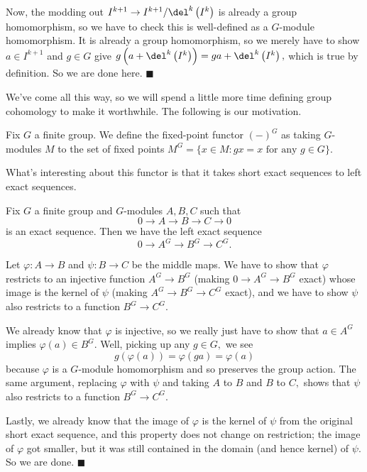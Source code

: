 Now, the modding out $I^{k+1}\to I^{k+1}/\del^k\left(I^k\right)$ is already a group homomorphism, so we have to check this is well-defined as a $G$-module homomorphism. It is already a group homomorphism, so we merely have to show $a\in I^{k+1}$ and $g\in G$ give $g\left(a+\del^k\left(I^k\right)\right)=ga+\del^k\left(I^k\right),$ which is true by definition. So we are done here. $\blacksquare$

We've come all this way, so we will spend a little more time defining group cohomology to make it worthwhile. The following is our motivation.
\begin{definition}
    Fix $G$ a finite group. We define the fixed-point functor $(-)^G$ as taking $G$-modules $M$ to the set of fixed points $M^G=\{x\in M:gx=x\text{ for any }g\in G\}.$
\end{definition}
What's interesting about this functor is that it takes short exact sequences to left exact sequences.
\begin{proposition}
    Fix $G$ a finite group and $G$-modules $A,B,C$ such that
    \[0\to A\to B\to C\to 0\]
    is an exact sequence. Then we have the left exact sequence
    \[0\to A^G\to B^G\to C^G.\]
\end{proposition}
Let $\varphi:A\to B$ and $\psi:B\to C$ be the middle maps. We have to show that $\varphi$ restricts to an injective function $A^G\to B^G$ (making $0\to A^G\to B^G$ exact) whose image is the kernel of $\psi$ (making $A^G\to B^G\to C^G$ exact), and we have to show $\psi$ also restricts to a function $B^G\to C^G.$

We already know that $\varphi$ is injective, so we really just have to show that $a\in A^G$ implies $\varphi(a)\in B^G.$ Well, picking up any $g\in G,$ we see
\[g(\varphi(a))=\varphi(ga)=\varphi(a)\]
because $\varphi$ is a $G$-module homomorphism and so preserves the group action. The same argument, replacing $\varphi$ with $\psi$ and taking $A$ to $B$ and $B$ to $C,$ shows that $\psi$ also restricts to a function $B^G\to C^G.$

Lastly, we already know that the image of $\varphi$ is the kernel of $\psi$ from the original short exact sequence, and this property does not change on restriction; the image of $\varphi$ got smaller, but it was still contained in the domain (and hence kernel) of $\psi.$ So we are done. $\blacksquare$

